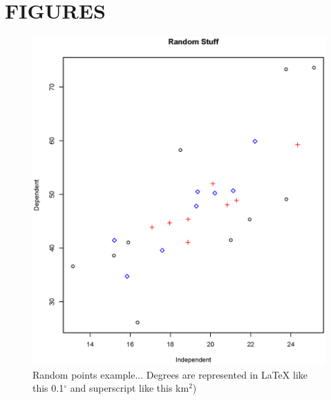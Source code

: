 \documentclass[11pt]{book}\usepackage[]{graphicx}\usepackage[]{color}
\makeatletter
\def\maxwidth{ %
  \ifdim\Gin@nat@width>\linewidth
    \linewidth
  \else
    \Gin@nat@width
  \fi
}
\newenvironment{knitrout}{}{} %
\newcommand{\latex}{\LaTeX\xspace}
\makeatother
\begin{document}
\section{FIGURES}

\begin{figure}[H]
\begin{center}
\begin{knitrout}
\color{fgcolor}
\includegraphics[width=\maxwidth]{knitr-cache/unnamed-chunk-3-1} 

\end{knitrout}
\end{center}
\caption{Random points example... Degrees are represented in \latex like this 0.1$^\circ$ and superscript like this km$^2$)}
\label{fig:example-random-stuff}
\end{figure}
\clearpage
\end{document}

